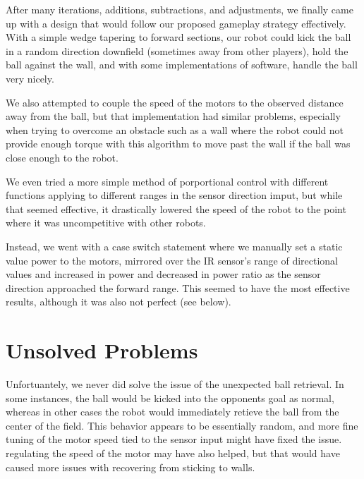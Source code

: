 \documentclass[journal]{../IEEEtran}
\begin{document}
After many iterations, additions, subtractions, and adjustments, we finally came up with a design that would follow our proposed gameplay strategy effectively. With a simple wedge tapering to forward sections, our robot could kick the ball in a random direction downfield (sometimes away from other players), hold the ball against the wall, and with some implementations of software, handle the ball very nicely.

We also attempted to couple the speed of the motors to the observed distance away from the ball, but that implementation had similar problems, especially when trying to overcome an obstacle such as a wall where the robot could not provide enough torque with this algorithm to move past the wall if the ball was close enough to the robot.

We even tried a more simple method of porportional control with different functions applying to different ranges in the sensor direction imput, but while that seemed effective, it drastically lowered the speed of the robot to the point where it was uncompetitive with other robots.

Instead, we went with a case switch statement where we manually set a static value power to the motors, mirrored over the IR sensor's range of directional values and increased in power and decreased in power ratio as the sensor direction approached the forward range. This seemed to have the most effective results, although it was also not perfect (see below).

\section{Unsolved Problems}\label{S.unsolved}

Unfortuantely, we never did solve the issue of the unexpected ball retrieval. In some instances, the ball would be kicked into the opponents goal as normal, whereas in other cases the robot would immediately retieve the ball from the center of the field. This behavior appears to be essentially random, and more fine tuning of the motor speed tied to the sensor input might have fixed the issue. regulating the speed of the motor may have also helped, but that would have caused more issues with recovering from sticking to walls.
\end{document}
